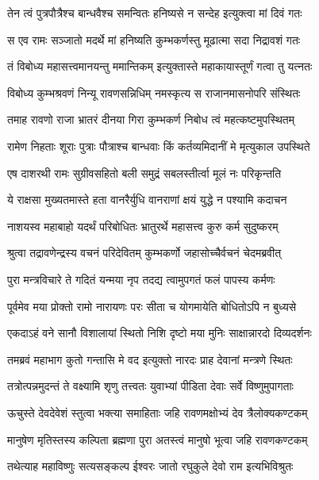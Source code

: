 \twolineshloka
{तेन त्वं पुत्रपौत्रैश्च बान्धवैश्च समन्वितः}
{हनिष्यसे न सन्देह इत्युक्त्वा मां दिवं गतः} %

\twolineshloka
{स एव रामः सञ्जातो मदर्थे मां हनिष्यति}
{कुम्भकर्णस्तु मूढात्मा सदा निद्रावशं गतः} %

\twolineshloka
{तं विबोध्य महासत्त्वमानयन्तु ममान्तिकम्}
{इत्युक्तास्ते महाकायास्तूर्णं गत्वा तु यत्नतः} %

\twolineshloka
{विबोध्य कुम्भश्रवणं निन्यू रावणसन्निधिम्}
{नमस्कृत्य स राजानमासनोपरि संस्थितः} %

\twolineshloka
{तमाह रावणो राजा भ्रातरं दीनया गिरा}
{कुम्भकर्ण निबोध त्वं महत्कष्टमुपस्थितम्} %

\twolineshloka
{रामेण निहताः शूराः पुत्राः पौत्राश्च बान्धवाः}
{किं कर्तव्यमिदानीं मे मृत्युकाल उपस्थिते} %

\twolineshloka
{एष दाशरथी रामः सुग्रीवसहितो बली}
{समुद्रं सबलस्तीर्त्वा मूलं नः परिकृन्तति} %

\twolineshloka
{ये राक्षसा मुख्यतमास्ते हता वानरैर्युधि}
{वानराणां क्षयं युद्धे न पश्यामि कदाचन} %

\twolineshloka
{नाशयस्व महाबाहो यदर्थं परिबोधितः}
{भ्रातुरर्थे महासत्त्व कुरु कर्म सुदुष्करम्} %

\twolineshloka
{श्रुत्वा तद्रावणेन्द्रस्य वचनं परिदेवितम्}
{कुम्भकर्णो जहासोच्चैर्वचनं चेदमब्रवीत्} %

\twolineshloka
{पुरा मन्त्रविचारे ते गदितं यन्मया नृप}
{तदद्य त्वामुपगतं फलं पापस्य कर्मणः} %

\twolineshloka
{पूर्वमेव मया प्रोक्तो रामो नारायणः परः}
{सीता च योगमायेति बोधितोऽपि न बुध्यसे} %

\twolineshloka
{एकदाऽहं वने सानौ विशालायां स्थितो निशि}
{दृष्टो मया मुनिः साक्षान्नारदो दिव्यदर्शनः} %

\twolineshloka
{तमब्रवं महाभाग कुतो गन्तासि मे वद}
{इत्युक्तो नारदः प्राह देवानां मन्त्रणे स्थितः} %

\twolineshloka
{तत्रोत्पन्नमुदन्तं ते वक्ष्यामि शृणु तत्त्वतः}
{युवाभ्यां पीडिता देवाः सर्वे विष्णुमुपागताः} %

\twolineshloka
{ऊचुस्ते देवदेवेशं स्तुत्वा भक्त्या समाहिताः}
{जहि रावणमक्षोभ्यं देव त्रैलोक्यकण्टकम्} %

\twolineshloka
{मानुषेण मृतिस्तस्य कल्पिता ब्रह्मणा पुरा}
{अतस्त्वं मानुषो भूत्वा जहि रावणकण्टकम्} %

\twolineshloka
{तथेत्याह महाविष्णुः सत्यसङ्कल्प ईश्वरः}
{जातो रघुकुले देवो राम इत्यभिविश्रुतः} %

